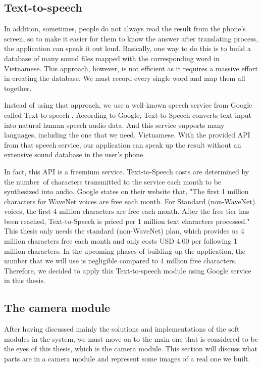 \subsection{Text-to-speech}

In addition, sometimes, people do not always read the result from the phone's screen, so to make it easier for them to know the answer after translating process, the application can speak it out loud. Basically, one way to do this is to build a database of many sound files mapped with the corresponding word in Vietnamese. This approach, however, is not efficient as it requires a massive effort in creating the database. We must record every single word and map them all together.

Instead of using that approach, we use a well-known speech service from Google called Text-to-speech \cite{GG:Text-to-Speech}. According to Google, Text-to-Speech converts text input into natural human speech audio data. And this service supports many languages, including the one that we need, Vietnamese. With the provided API from that speech service, our application can speak up the result without an extensive sound database in the user's phone.

In fact, this API is a freemium service. Text-to-Speech costs are determined by the number of characters transmitted to the service each month to be synthesized into audio. Google states on their website that,  "The first 1 million characters for WaveNet voices are free each month. For Standard (non-WaveNet) voices, the first 4 million characters are free each month. After the free tier has been reached, Text-to-Speech is priced per 1 million text characters processed." This thesis only needs the standard (non-WaveNet) plan, which provides us 4 million characters free each month and only costs USD 4.00 per following 1 million characters. In the upcoming phases of building up the application, the number that we will use is negligible compared to 4 million free characters. Therefore, we decided to apply this Text-to-speech module using Google service in this thesis.





\subsection{The camera module}

After having discussed mainly the solutions and implementations of the soft modules in the system, we must move on to the main one that is considered to be the eyes of this thesis, which is the camera module. This section will discuss what parts are in a camera module and represent some images of a real one we built.

